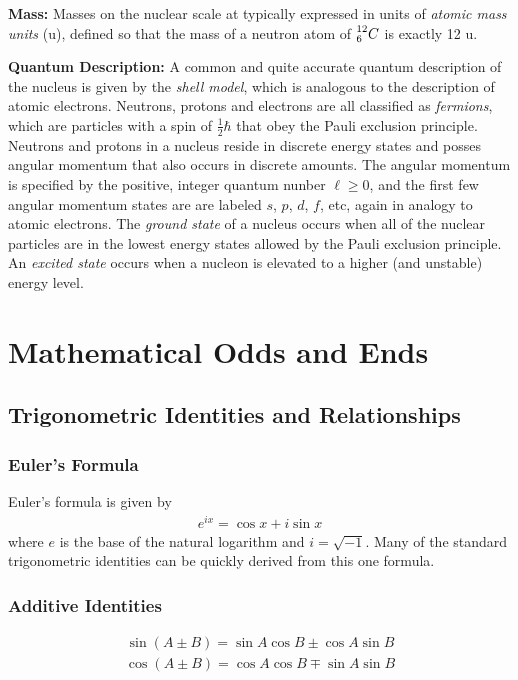 \documentclass[11pt]{article}
\newcommand\leftidx[3]{{\vphantom{#2}}#1#2#3}
\begin{document}
\textbf{Mass:} Masses on the nuclear scale at typically expressed in units of \emph{atomic mass units} (u), defined so that the mass of a neutron atom of \(\leftidx{^{12}_6}{C}{}\) is exactly 12 u.

\textbf{Quantum Description:}  A common and quite accurate quantum description of the nucleus is given by the \emph{shell model}, which is analogous to the description of atomic electrons.  Neutrons, protons and electrons are all classified as \emph{fermions}, which are particles with a spin of \(\frac{1}{2}\hbar\) that obey the Pauli exclusion principle.  Neutrons and protons in a nucleus reside in discrete energy states and posses angular momentum that also occurs in discrete amounts.  The angular momentum is specified by the positive, integer quantum nunber \(\ell \geq 0\), and the first few angular momentum states are are labeled \(s\), \(p\), \(d\), \(f\), etc, again in analogy to atomic electrons.  The \emph{ground state} of a nucleus occurs when all of the nuclear particles are in the lowest energy states allowed by the Pauli exclusion principle.  An \emph{excited state} occurs when a nucleon is elevated to a higher (and unstable) energy level.

\section{Mathematical Odds and Ends}
\label{sec:orgheadline43}
\subsection{Trigonometric Identities and Relationships}
\label{sec:orgheadline38}
\subsubsection{Euler's Formula}
\label{sec:orgheadline35}
Euler's formula is given by
\begin{align}
  e^{i x} = \cos x + i \sin x
\end{align}
where \(e\) is the base of the natural logarithm and \(i = \sqrt{-1}\).  Many of the standard trigonometric identities can be quickly derived from this one formula.
\subsubsection{Additive Identities}
\label{sec:orgheadline36}
\begin{align}
  \sin\left(A \pm B\right) = \sin A \cos B \pm \cos A \sin B
\end{align}
\begin{align}
  \cos\left(A \pm B\right) = \cos A \cos B \mp \sin A \sin B
\end{align}
\end{document}

